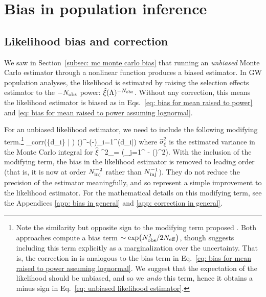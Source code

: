 \documentclass[%
 reprint,
 amsmath,amssymb,
 aps,nofootinbib,nobibnotes,onecolumn,prd
]{revtex4-2}
\begin{document}
\section{Bias in population inference}
\label{sec: mc bias in population inference}


\subsection{Likelihood bias and correction}

We saw in Section~\ref{subsec: mc monte carlo bias} that running an \textit{unbiased} Monte Carlo estimator through a nonlinear function produces a biased estimator. In \ac{GW} population analyses, the likelihood is estimated by raising the selection effects estimator to the $-N_{\rm obs}$ power: $\hat{\xi}(\Lambda)^{-N_{\rm obs}}$.
Without any correction, this means the likelihood estimator is biased as in Eqs.~\ref{eq: bias for mean raised to power} and \ref{eq: bias for mean raised to power assuming lognormal}. 

For an unbiased likelihood estimator, we need to include the following modifying term.\footnote{Note the similarity but opposite sign to the modifying term proposed \citet{Farr:2019rap}. Both approaches compute a bias term $\sim \exp(N_{\rm obs}^2/2N_{\rm eff})$, though \citet{Farr:2019rap} suggests including this term explicitly as a marginalization over the uncertainty. That is, the correction in \citet{Farr:2019rap} is analogous to the bias term in Eq.~\ref{eq: bias for mean raised to power assuming lognormal}. We suggest that the expectation of the likelihood should be unbiased, and so we \textit{undo} this term, hence it obtains a minus sign in Eq.~\ref{eq: unbiased likelihood estimator}.}
\beq
{}_{\rm corr}(\{d_i\} | \Lambda) \equiv \hat{\xi}(\Lambda)^{-\Nobs}\exp\left(-\right)\prod_{i=1}^{\Nobs}(d_i|\Lambda)
\label{eq: unbiased likelihood estimator}
\eeq
where $\hat{\sigma}^2_{\xi}$ is the estimated variance in the Monte Carlo integral for $\hat{\xi}$
\beq
\hat{\sigma}^2_\xi = \left(\sum_{j=1}^{\Ninj} - \hat{\xi}(\Lambda)^2\right).
\eeq
With the inclusion of the modifying term, the bias in the likelihood estimator is removed to leading order (that is, it is now at order $N_{\rm inj}^{-2}$ rather than $N_{\rm inj}^{-1}$). They do not reduce the precision of the estimator meaningfully, and so represent a simple improvement to the likelihood estimator. For the mathematical details on this modifying term, see the Appendices \ref{app: bias in general} and \ref{app: correction in general}.
\end{document}
